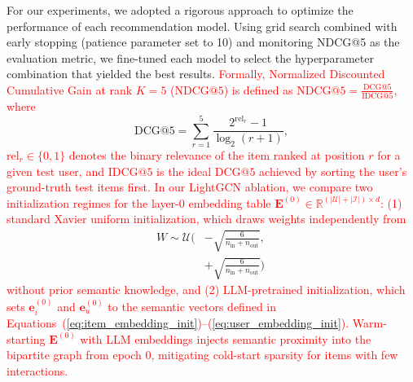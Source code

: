 For our experiments, we adopted a rigorous approach to optimize the performance of each recommendation model. Using grid search combined with early stopping (patience parameter set to 10) and monitoring NDCG@5 as the evaluation metric, we fine-tuned each model to select the hyperparameter combination that yielded the best results. \textcolor{red}{Formally, Normalized Discounted Cumulative Gain at rank $K=5$ ($\text{NDCG}@5$) is defined as $\text{NDCG}@5 = \frac{\text{DCG}@5}{\text{IDCG}@5}$, where}
{\color{red}\begin{equation}\label{eq:dcg_def}
\text{DCG}@5 = \sum_{r=1}^{5} \frac{2^{\text{rel}_r} - 1}{\log_2(r + 1)},
\end{equation}}
\textcolor{red}{$\text{rel}_r \in \{0, 1\}$ denotes the binary relevance of the item ranked at position $r$ for a given test user, and $\text{IDCG}@5$ is the ideal $\text{DCG}@5$ achieved by sorting the user's ground-truth test items first. In our LightGCN ablation, we compare two initialization regimes for the layer-0 embedding table $\mathbf{E}^{(0)} \in \mathbb{R}^{(|\mathcal{U}|+|\mathcal{I}|) \times d}$: (1) standard Xavier uniform initialization, which draws weights independently from}
{\color{red}\begin{equation}\label{eq:xavier_init}
\begin{aligned}
W \sim \mathcal{U}\Bigg( &-\sqrt{\frac{6}{n_{\text{in}} + n_{\text{out}}}},\, \\
&+\sqrt{\frac{6}{n_{\text{in}} + n_{\text{out}}}}\Bigg)
\end{aligned}
\end{equation}}
\textcolor{red}{ without prior semantic knowledge, and (2) LLM-pretrained initialization, which sets $\mathbf{e}_i^{(0)}$ and $\mathbf{e}_u^{(0)}$ to the semantic vectors defined in Equations~(\ref{eq:item_embedding_init})--(\ref{eq:user_embedding_init}). Warm-starting $\mathbf{E}^{(0)}$ with LLM embeddings injects semantic proximity into the bipartite graph from epoch 0, mitigating cold-start sparsity for items with few interactions.}

